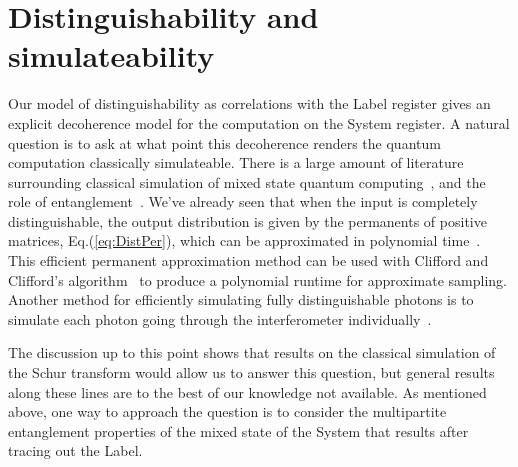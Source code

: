 \section{Distinguishability and simulateability}
\label{sec:mixture}

Our model of distinguishability as correlations with the Label register gives an explicit decoherence model for the computation on the System register.
A natural question is to ask at what point this decoherence renders the quantum computation classically simulateable.
There is a large amount of literature surrounding classical simulation of mixed state quantum computing~\cite{fujii2014, morimae2014classical, morimae2014hardness}, and the role of entanglement~\cite{harrow2003, virmani2005, buhrman2006, vidal2003, animesh2007}. 
We've already seen that when the input is completely distinguishable, the output distribution is given by the permanents of positive matrices, Eq.(\ref{eq:DistPer}), which can be approximated in polynomial time~\cite{anari2017}. 
This efficient permanent approximation method can be used with Clifford and Clifford's algorithm~\cite{clifford2017} to produce a polynomial runtime for approximate sampling. 
Another method for efficiently simulating fully distinguishable photons is to simulate each photon going through the interferometer individually~\cite{aaronson2014,neville2017}. 

The discussion up to this point shows that results on the classical simulation of the Schur transform would allow us to answer this question, but general results along these lines are to the best of our knowledge not available.
As mentioned above, one way to approach the question is to consider the multipartite entanglement properties of the mixed state of the System that results after tracing out the Label.

